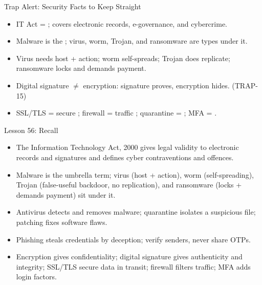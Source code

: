 \documentclass[aspectratio=169]{beamer}
\begin{document}
\begin{frame}{Trap Alert: Security Facts to Keep Straight}
  \begin{itemize}
    \item IT Act = ; covers electronic records, e-governance,
      and cybercrime.
    \item Malware is the ; virus, worm, Trojan, and
      ransomware are types under it.
    \item Virus needs host + action; worm self-spreads; Trojan does
       replicate; ransomware locks and demands payment.
    \item Digital signature $\ne$ encryption: signature proves,
      encryption hides. (TRAP-15)
    \item SSL/TLS = secure ; firewall = traffic
      ; quarantine = ; MFA = .
  \end{itemize}
\end{frame}

\begin{frame}{Lesson 56: Recall}
  \begin{itemize}
    \item The Information Technology Act, 2000 gives legal validity to
      electronic records and signatures and defines cyber contraventions
      and offences.
    \item Malware is the umbrella term; virus (host + action), worm
      (self-spreading), Trojan (false-useful backdoor, no replication),
      and ransomware (locks + demands payment) sit under it.
    \item Antivirus detects and removes malware; quarantine isolates a
      suspicious file; patching fixes software flaws.
    \item Phishing steals credentials by deception; verify senders, never
      share OTPs.
    \item Encryption gives confidentiality; digital signature gives
      authenticity and integrity; SSL/TLS secure data in transit;
      firewall filters traffic; MFA adds login factors.
  \end{itemize}
\end{frame}
\end{document}
